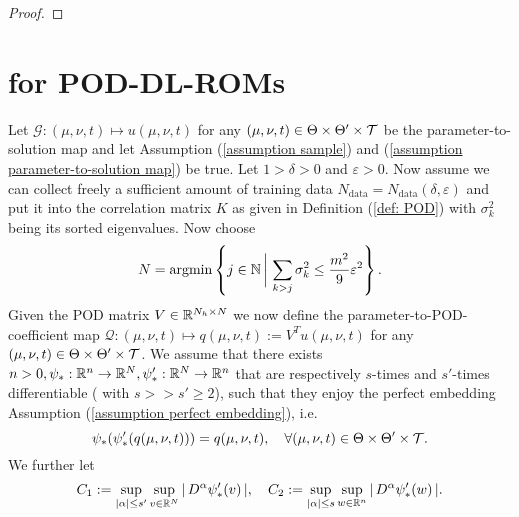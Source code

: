 \begin{proof}

\end{proof}


\section{for POD-DL-ROMs}


\begin{theorem} \label{theo: PAC bound for POD-DL-ROM}
    Let $\mathcal{G}: (\mu, \nu, t) \mapsto u(\mu, \nu, t)$ for any $(\mu, \nu, t) \in \Theta \times \Theta' \times \mathcal{T}$ be the
    parameter-to-solution map and let Assumption (\ref{assumption sample}) and (\ref{assumption parameter-to-solution map}) be true. Let $1  > \delta > 0$ and $\varepsilon > 0$.
    Now assume we can collect freely a sufficient amount of training data $N_{\text{data}} = N_{\text{data}}(\delta, \varepsilon)$ and put it into the
    correlation matrix $K$ as given in Definition (\ref{def: POD}) with $\sigma_k^2$ being its sorted eigenvalues. Now choose
    \begin{equation*}
        N = \operatorname{argmin} \left\{ j \in \mathbb{N} \, \bigg\vert \, \sum_{k > j} \sigma^2_k \leq \frac{m^2}{9} \varepsilon^2 \right\}.
    \end{equation*}
    Given the POD matrix $V \in \mathbb{R}^{N_h \times N}$ we now define the parameter-to-POD-coefficient map 
    $\mathcal{Q}: (\mu, \nu, t) \mapsto q(\mu, \nu, t) :=  V^T u(\mu, \nu, t)$ for 
    any $(\mu, \nu, t) \in \Theta \times \Theta' \times \mathcal{T}$. We assume that there exists $n > 0, \psi_* : \mathbb{R}^n \to \mathbb{R}^N, \psi_*' : \mathbb{R}^N \to \mathbb{R}^n$ that are respectively $s$-times and
    $s'$-times differentiable ( with $s >> s' \geq 2$), such that they enjoy the perfect embedding Assumption (\ref{assumption perfect embedding}), i.e. 
    \begin{equation*}
        \psi_*(\psi_*'(q(\mu, \nu, t))) = q(\mu, \nu, t), \quad \forall (\mu, \nu, t) \in \Theta \times \Theta' \times \mathcal{T}.
    \end{equation*}
    We further let 
    \begin{equation*}
        C_1 := \sup\limits_{\vert \alpha \vert \leq s'} \sup\limits_{v \in \mathbb{R}^N} \vert \, D^\alpha \psi_*'(v) \, \vert, \quad 
        C_2 := \sup\limits_{\vert \alpha \vert \leq s} \sup\limits_{w \in \mathbb{R}^n} \vert \, D^\alpha \psi_*'(w) \, \vert.
    \end{equation*}

\end{theorem}

